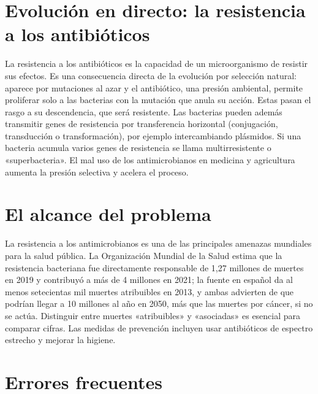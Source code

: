 \documentclass{book}
\begin{document}

\section{Evolución en directo: la resistencia a los antibióticos}

La resistencia a los antibióticos es la capacidad de un microorganismo de resistir sus efectos. Es una consecuencia directa de la evolución por selección natural: aparece por mutaciones al azar y el antibiótico, una presión ambiental, permite proliferar solo a las bacterias con la mutación que anula su acción. Estas pasan el rasgo a su descendencia, que será resistente. Las bacterias pueden además transmitir genes de resistencia por transferencia horizontal (conjugación, transducción o transformación), por ejemplo intercambiando plásmidos. Si una bacteria acumula varios genes de resistencia se llama multirresistente o «superbacteria». El mal uso de los antimicrobianos en medicina y agricultura aumenta la presión selectiva y acelera el proceso.


\section{El alcance del problema}

La resistencia a los antimicrobianos es una de las principales amenazas mundiales para la salud pública. La Organización Mundial de la Salud estima que la resistencia bacteriana fue directamente responsable de 1,27 millones de muertes en 2019 y contribuyó a más de 4 millones en 2021; la fuente en español da al menos setecientas mil muertes atribuibles en 2013, y ambas advierten de que podrían llegar a 10 millones al año en 2050, más que las muertes por cáncer, si no se actúa. Distinguir entre muertes «atribuibles» y «asociadas» es esencial para comparar cifras. Las medidas de prevención incluyen usar antibióticos de espectro estrecho y mejorar la higiene.


\section{Errores frecuentes}
\end{document}
